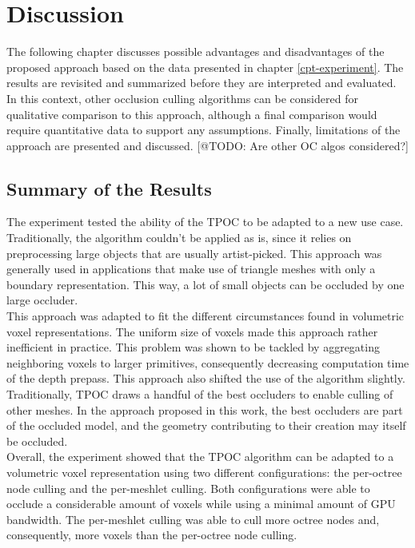 \chapter{Discussion} \label{cpt-discussion}

The following chapter discusses possible advantages and disadvantages of the proposed approach based on 
the data presented in chapter \ref{cpt-experiment}. The results are revisited and summarized before they 
are interpreted and evaluated. In this context, other occlusion culling algorithms can be considered for 
qualitative comparison to this approach, although a final comparison would require quantitative data to 
support any assumptions. Finally, limitations of the approach are presented and discussed. [@TODO: Are other OC algos considered?]

\section{Summary of the Results}

The experiment tested the ability of the \ac{TPOC} to be adapted to a new use case. Traditionally, the algorithm 
couldn't be applied as is, since it relies on preprocessing large objects that are usually artist-picked. This 
approach was generally used in applications that make use of triangle meshes with only a boundary representation. 
This way, a lot of small objects can be occluded by one large occluder. \\

\noindent
This approach was adapted to fit the different circumstances found in volumetric voxel representations. The 
uniform size of voxels made this approach rather inefficient in practice. This problem was shown to be 
tackled by aggregating neighboring voxels to larger primitives, consequently decreasing computation time 
of the depth prepass. This approach also shifted the use of the algorithm slightly. Traditionally, \ac{TPOC} 
draws a handful of the best occluders to enable culling of other meshes. In the approach proposed in this work, 
the best occluders are part of the occluded model, and the geometry contributing to their creation may 
itself be occluded. \\

\noindent
Overall, the experiment showed that the \ac{TPOC} algorithm can be adapted to a volumetric voxel representation 
using two different configurations: the per-octree node culling and the per-meshlet culling. Both configurations 
were able to occlude a considerable amount of voxels while using a minimal amount of \ac{GPU} bandwidth. The 
per-meshlet culling was able to cull more octree nodes and, consequently, more voxels than the per-octree node 
culling. \\

